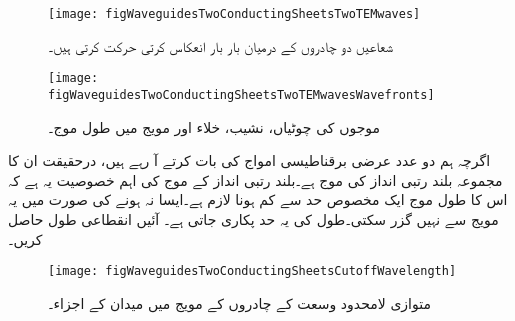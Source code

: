 \begin{figure}
\centering
\texttt{[image: figWaveguidesTwoConductingSheetsTwoTEMwaves]}
\caption{شعاعیں دو چادروں کے درمیان بار بار انعکاس کرتی حرکت کرتی ہیں۔}
\label{شکل_مویج_شعاع_انعکاس_کرتی_حرکت_کرتی_ہے}
\end{figure}
%
\begin{figure}
\centering
\texttt{[image: figWaveguidesTwoConductingSheetsTwoTEMwavesWavefronts]}
\caption{موجوں کی چوٹیاں، نشیب، خلاء اور مویج میں طول موج۔}
\label{شکل_مویج_خالی_خلاء_اور_مویج_طول-موج}
\end{figure}

اگرچہ ہم دو عدد عرضی برقناطیسی  امواج کی بات کرتے آ رہے ہیں، درحقیقت ان کا مجموعہ بلند رتبی  انداز کی موج ہے۔بلند رتبی انداز کے موج کی اہم خصوصیت  یہ ہے کہ اس کا طول موج ایک مخصوص حد سے کم ہونا لازم ہے۔ایسا نہ ہونے کی صورت میں یہ مویج سے نہیں گزر سکتی۔طول کی یہ حد  پکاری جاتی ہے۔ آئیں انقطاعی طول حاصل کریں۔

 \begin{figure}
\centering
\texttt{[image: figWaveguidesTwoConductingSheetsCutoffWavelength]}
\caption{متوازی لامحدود وسعت کے چادروں کے مویج میں میدان کے اجزاء۔}
\label{شکل_مویج_متوازی_چادر_مویج_اجزاء_میدان}
\end{figure}

